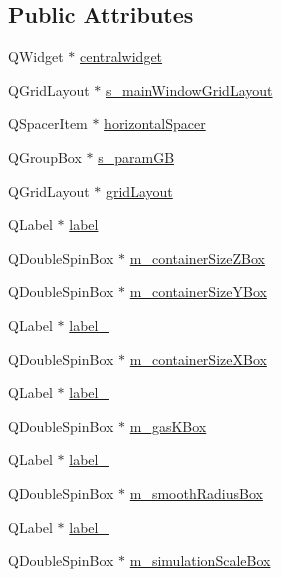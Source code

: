\subsection*{Public Attributes}
\begin{DoxyCompactItemize}
\item 
QWidget $\ast$ \hyperlink{classUi__MainWindow_a356f1cf3ebda15f1fac59467ee081b74}{centralwidget}
\item 
QGridLayout $\ast$ \hyperlink{classUi__MainWindow_ae7902f78acf2ddd14bbda720ac54c450}{s\_\-mainWindowGridLayout}
\item 
QSpacerItem $\ast$ \hyperlink{classUi__MainWindow_a7871ea8c4b6c595d7ccd53960b344719}{horizontalSpacer}
\item 
QGroupBox $\ast$ \hyperlink{classUi__MainWindow_aad6df58cb61e92bd39ce02dcc8a4bd89}{s\_\-paramGB}
\item 
QGridLayout $\ast$ \hyperlink{classUi__MainWindow_a525ed3c5fe0784ac502ee222fba4e205}{gridLayout}
\item 
QLabel $\ast$ \hyperlink{classUi__MainWindow_ad9c89133780f28e6efa2ec17ceb9cff5}{label}
\item 
QDoubleSpinBox $\ast$ \hyperlink{classUi__MainWindow_ad1e34c68f361631331d52954f0da3347}{m\_\-containerSizeZBox}
\item 
QDoubleSpinBox $\ast$ \hyperlink{classUi__MainWindow_a27bcf5d57831be2acc8043f2d6b91916}{m\_\-containerSizeYBox}
\item 
QLabel $\ast$ \hyperlink{classUi__MainWindow_a2e2516d755e4dd53fc905dabddf2738a}{label\_}
\item 
QDoubleSpinBox $\ast$ \hyperlink{classUi__MainWindow_a38f97cea09f884843bb90a7c71093d78}{m\_\-containerSizeXBox}
\item 
QLabel $\ast$ \hyperlink{classUi__MainWindow_a0e90c7e9ad77386881e0b264ddb9dd22}{label\_}
\item 
QDoubleSpinBox $\ast$ \hyperlink{classUi__MainWindow_a4f9f72f5874dab4be00f166117b0adc3}{m\_\-gasKBox}
\item 
QLabel $\ast$ \hyperlink{classUi__MainWindow_a78c7e10730b43c6700cd7216911ed76a}{label\_}
\item 
QDoubleSpinBox $\ast$ \hyperlink{classUi__MainWindow_a8941af0576a2bbc18b2eb4812a0cb957}{m\_\-smoothRadiusBox}
\item 
QLabel $\ast$ \hyperlink{classUi__MainWindow_ad6bab8fb8903b8f41afea1218ee52695}{label\_}
\item 
QDoubleSpinBox $\ast$ \hyperlink{classUi__MainWindow_a223abe14980fe1049e3bbdf0ed376a0a}{m\_\-simulationScaleBox}

\end{DoxyCompactItemize}

